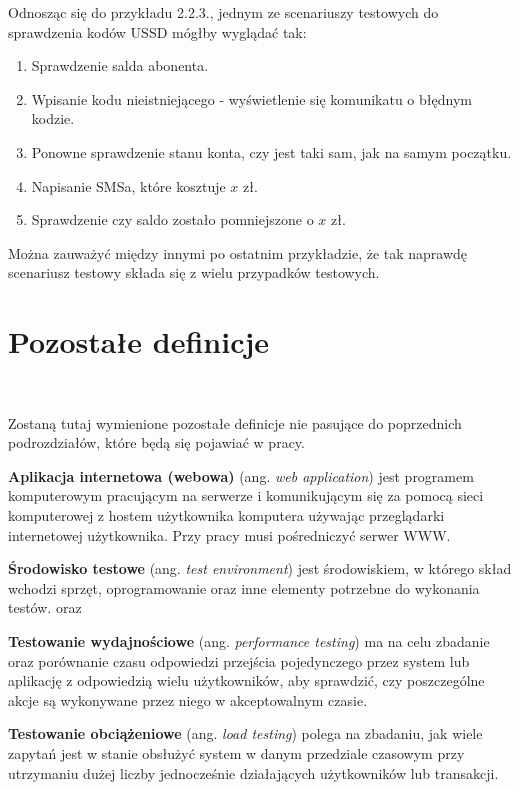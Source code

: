 \begin{prz}
Odnosząc się do przykładu 2.2.3., jednym ze scenariuszy testowych do sprawdzenia kodów USSD mógłby wyglądać tak:

\begin{enumerate}
    \item Sprawdzenie salda abonenta.
    \item Wpisanie kodu nieistniejącego - wyświetlenie się komunikatu o błędnym kodzie. 
    \item Ponowne sprawdzenie stanu konta, czy jest taki sam, jak na samym początku.
    \item Napisanie SMSa, które kosztuje $x$ zł.
    \item Sprawdzenie czy saldo zostało pomniejszone o $x$ zł.
\end{enumerate}

\end{prz}

Można zauważyć między innymi po ostatnim przykładzie, że tak naprawdę scenariusz testowy składa się z wielu przypadków testowych.

\section{Pozostałe definicje} \ 

Zostaną tutaj wymienione pozostałe definicje nie pasujące do poprzednich podrozdziałów, które będą się pojawiać w pracy.

\begin{df}
\textbf{Aplikacja internetowa (webowa)} (ang. \textit{web application}) jest programem komputerowym pracującym na serwerze i komunikującym się za pomocą sieci komputerowej z hostem użytkownika komputera używając przeglądarki internetowej użytkownika. Przy pracy musi pośredniczyć serwer WWW. \cite{webapp}
\end{df}

\begin{df}
\textbf{Środowisko testowe} (ang. \textit{test environment}) jest środowiskiem, w którego skład wchodzi sprzęt, oprogramowanie oraz inne elementy potrzebne do wykonania testów. \cite{roman} oraz \cite{ieee}
\end{df}

\begin{df}
\textbf{Testowanie wydajnościowe} (ang. \textit{performance testing}) ma na celu zbadanie oraz porównanie czasu odpowiedzi przejścia pojedynczego przez system lub aplikację z odpowiedzią wielu użytkowników, aby sprawdzić, czy poszczególne akcje są wykonywane przez niego w akceptowalnym czasie. \cite{roman}
\end{df}

\begin{df}
\textbf{Testowanie obciążeniowe} (ang. \textit{load testing}) polega na zbadaniu, jak wiele zapytań jest w stanie obsłużyć system w danym przedziale czasowym przy utrzymaniu dużej liczby jednocześnie działających użytkowników lub transakcji. \cite{roman}
\end{df}

